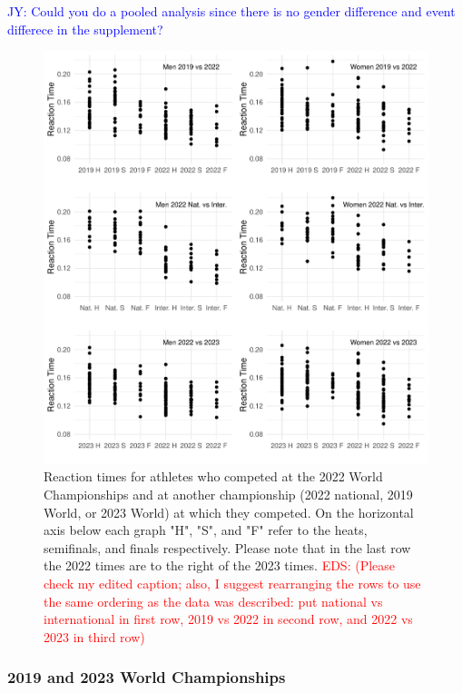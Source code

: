 \documentclass[12pt, letterpaper]{article}
\newcommand{\jy}[1]{\textcolor{blue}{JY: #1}}
\newcommand{\eds}[1]{\textcolor{red}{EDS: (#1)}}
\begin{document}
\jy{Could you do a pooled analysis since there is no gender difference
  and event differece in the supplement?}



\begin{figure}[tbp]
  \centering
  \includegraphics[width=\textwidth]{RankScatterPlots}
  \caption{Reaction times for athletes who competed at the 2022 World Championships
	and at another championship (2022 national, 2019 World, or 2023 World) at which 
	they competed. On the horizontal
  axis below each graph "H", "S", and "F" refer to the heats, semifinals, and 
  finals respectively. Please note that in the last row the 2022 times are to
  the right of the 2023 times.
	\eds{Please check my edited caption; also, I suggest rearranging the rows to 
	use the same ordering as the data was described: put national vs international 
	in first row, 2019 vs 2022 in second row, and 2022 vs 2023 in third row}
	}
  \label{fig:RankScatterplots}
\end{figure}

\subsubsection{2019 and 2023 World Championships}
\label{sec:data2019}
\end{document}
